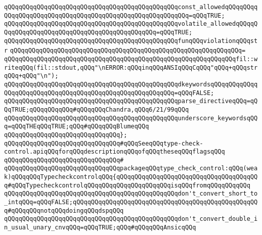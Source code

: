 \verb|qQQqqQQqqQQqqQQqqQQqqQQqqQQqqQQqqQQqqQQqqQQqqQQqconst_allowedqQQqqQQqqQQqqQQqqQQqqQQqqQQqqQQqqQQqqQQqqQQqqQQqqQQqqQQqqQQq=qQQqTRUE;|\newline
\verb|qQQqqQQqqQQqqQQqqQQqqQQqqQQqqQQqqQQqqQQqqQQqqQQqvolatile_allowedqQQqqQQqqQQqqQQqqQQqqQQqqQQqqQQqqQQqqQQqqQQqqQQq=qQQqTRUE;|\newline
\newline
\verb|qQQqqQQqqQQqqQQqqQQqqQQqqQQqqQQqqQQqqQQqqQQqqQQqfunqQQqviolationqQQqstr|\newline
\verb|qQQqqQQqqQQqqQQqqQQqqQQqqQQqqQQqqQQqqQQqqQQqqQQqqQQqqQQqqQQqqQQq=|\newline
\verb|qQQqqQQqqQQqqQQqqQQqqQQqqQQqqQQqqQQqqQQqqQQqqQQqqQQqqQQqqQQqqQQqfil::writeqQQq(fil::stdout,qQQq"\nERROR:qQQqinqQQqANSIqQQqCqQQq"qQQq+qQQqstrqQQq+qQQq"\n");|\newline
\newline
\verb|qQQqqQQqqQQqqQQqqQQqqQQqqQQqqQQqqQQqqQQqqQQqqQQqdkeywordsqQQqqQQqqQQqqQQqqQQqqQQqqQQqqQQqqQQqqQQqqQQqqQQqqQQqqQQqqQQq=qQQqFALSE;|\newline
\verb|qQQqqQQqqQQqqQQqqQQqqQQqqQQqqQQqqQQqqQQqqQQqqQQqparse_directiveqQQq=qQQqTRUE;qQQqqQQqqQQq#qQQqqQQqChandra,qQQq6/21/99qQQq|\newline
\verb|qQQqqQQqqQQqqQQqqQQqqQQqqQQqqQQqqQQqqQQqqQQqqQQqunderscore_keywordsqQQq=qQQqTHEqQQqTRUE;qQQq#qQQqqQQqBlumeqQQq|\newline
\verb|qQQqqQQqqQQqqQQqqQQqqQQqqQQqqQQq};|\newline
\newline
\verb|qQQqqQQqqQQqqQQqqQQqqQQqqQQqqQQq#qQQqSeeqQQqtype-check-control.apiqQQqforqQQqdescriptionqQQqofqQQqtheseqQQqflagsqQQq|\newline
\verb|qQQqqQQqqQQqqQQqqQQqqQQqqQQqqQQq#|\newline
\verb|qQQqqQQqqQQqqQQqqQQqqQQqqQQqqQQqpackageqQQqtype_check_control:qQQq(weak)qQQqqQQqTypecheckcontrolqQQq{qQQqqQQqqQQqqQQqqQQqqQQqqQQqqQQqqQQqqQQq#qQQqTypecheckcontrolqQQqqQQqqQQqqQQqqQQqqQQqisqQQqfromqQQqqQQqqQQq|\newline
\newline
\verb|qQQqqQQqqQQqqQQqqQQqqQQqqQQqqQQqqQQqqQQqqQQqqQQqdon't_convert_short_to_intqQQq=qQQqFALSE;qQQqqQQqqQQqqQQqqQQqqQQqqQQqqQQqqQQqqQQqqQQqqQQqqQQq#qQQqqQQqnotqQQqdoingqQQqdspqQQq|\newline
\verb|qQQqqQQqqQQqqQQqqQQqqQQqqQQqqQQqqQQqqQQqqQQqqQQqdon't_convert_double_in_usual_unary_cnvqQQq=qQQqTRUE;qQQq#qQQqqQQqAnsicqQQq|\newline
